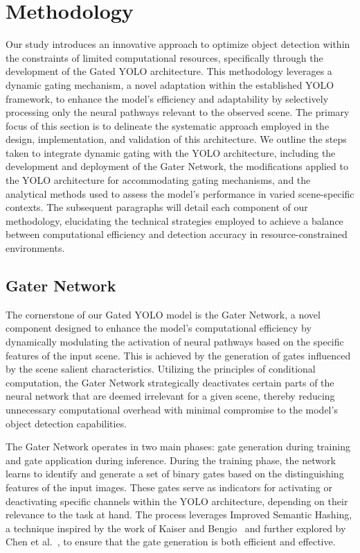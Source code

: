 \section{Methodology} 

Our study introduces an innovative approach to optimize object detection within the constraints of limited computational resources, specifically through the development of the Gated YOLO architecture. This methodology leverages a dynamic gating mechanism, a novel adaptation within the established YOLO framework, to enhance the model's efficiency and adaptability by selectively processing only the neural pathways relevant to the observed scene. The primary focus of this section is to delineate the systematic approach employed in the design, implementation, and validation of this architecture. We outline the steps taken to integrate dynamic gating with the YOLO architecture, including the development and deployment of the Gater Network, the modifications applied to the YOLO architecture for accommodating gating mechanisms, and the analytical methods used to assess the model's performance in varied scene-specific contexts. The subsequent paragraphs will detail each component of our methodology, elucidating the technical strategies employed to achieve a balance between computational efficiency and detection accuracy in resource-constrained environments.

\subsection{Gater Network}
The cornerstone of our Gated YOLO model is the Gater Network, a novel component designed to enhance the model's computational efficiency by dynamically modulating the activation of neural pathways based on the specific features of the input scene. This is achieved by the generation of gates influenced by the scene salient characteristics. Utilizing the principles of conditional computation, the Gater Network strategically deactivates certain parts of the neural network that are deemed irrelevant for a given scene, thereby reducing unnecessary computational overhead with minimal compromise to the model's object detection capabilities.

The Gater Network operates in two main phases: gate generation during training and gate application during inference. During the training phase, the network learns to identify and generate a set of binary gates based on the distinguishing features of the input images. These gates serve as indicators for activating or deactivating specific channels within the YOLO architecture, depending on their relevance to the task at hand. The process leverages Improved Semantic Hashing, a technique inspired by the work of Kaiser and Bengio~\cite{kaiser2018discrete} and further explored by Chen et al.~\cite{chen2019you}, to ensure that the gate generation is both efficient and effective.

